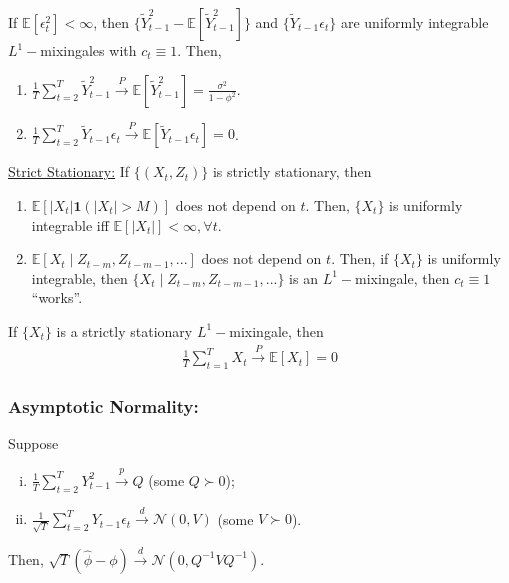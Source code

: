 \documentclass[11pt]{elegantbook}
\begin{document}
\begin{example}[ (AR(1) Example)]
    If $\mathbb{E}[\epsilon_t^2]<\infty$, then $\{\tilde{Y}_{t-1}^2-\mathbb{E}[\tilde{Y}_{t-1}^2]\}$ and $\{\tilde{Y}_{t-1}\epsilon_t\}$ are uniformly integrable $L^1-$mixingales with $c_t\equiv 1$. Then,
    \begin{enumerate}
        \item $\frac{1}{T}\sum_{t=2}^T\tilde{Y}_{t-1}^2 \stackrel{P}{\longrightarrow} \mathbb{E}[\tilde{Y}_{t-1}^2]=\frac{\sigma^2}{1-\phi^2}$.
        \item $\frac{1}{T}\sum_{t=2}^T\tilde{Y}_{t-1}\epsilon_t \stackrel{P}{\longrightarrow} \mathbb{E}[\tilde{Y}_{t-1}\epsilon_t] = 0$.
    \end{enumerate}
    \underline{Strict Stationary:} If $\{(X_t,Z_t)\}$ is strictly stationary, then
    \begin{enumerate}[$\circ$]
        \item $\mathbb{E}\left[|X_t|\mathbf{1}\left(|X_t|>M\right)\right]$ does not depend on $t$. Then, $\{X_t\}$ is uniformly integrable iff $\mathbb{E}\left[|X_t|\right]<\infty,\forall t$.
        \item $\mathbb{E}[X_t\mid Z_{t-m},Z_{t-m-1},...]$ does not depend on $t$. Then, if $\{X_t\}$ is uniformly integrable, then $\{X_t\mid Z_{t-m},Z_{t-m-1},...\}$ is an $L^1-$mixingale, then $c_t\equiv 1$ ``works''.
    \end{enumerate}
\end{example}
\begin{corollary}
    If $\{X_t\}$ is a strictly stationary $L^1-$mixingale, then
    \begin{equation}
        \begin{aligned}
            \frac{1}{T}\sum_{t=1}^T X_t \stackrel{P}{\rightarrow} \mathbb{E}[X_t]=0
        \end{aligned}
        \nonumber
    \end{equation}
\end{corollary}

\subsubsection*{Asymptotic Normality:} Suppose
\begin{enumerate}[(i).]
    \item $\frac{1}{T}\sum_{t=2}^T Y_{t-1}^2 \stackrel{p}{\longrightarrow} Q$ (some $Q\succ 0$);
    \item $\frac{1}{\sqrt{T}}\sum_{t=2}^T Y_{t-1}\epsilon_t \stackrel{d}{\longrightarrow} \mathcal{N}\left(0,V\right)$ (some $V\succ 0$).
\end{enumerate}
Then, $\sqrt{T}\left(\hat{\phi}-\phi\right) \stackrel{d}{\longrightarrow} \mathcal{N}\left(0,Q^{-1}VQ^{-1}\right)$.
\end{document}
